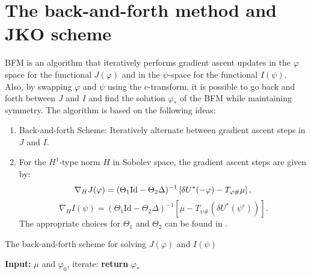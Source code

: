 \documentclass[a4,10.5pt, twocolumn, dvipdfmx]{article}
\theoremstyle{definition}
\begin{document}
\section{The back-and-forth method and JKO scheme }
BFM is an algorithm that iteratively performs gradient ascent updates in the \(\varphi\) space for the functional \(J(\varphi) \) and in the \(\psi\)-space for the functional \(I(\psi)\). 
Also, by swapping $\varphi$ and $\psi$ using the $c$-transform, it is possible to go back and forth between $J$ and $I$ and find the solution $\varphi_*$ of the BFM while maintaining symmetry.
The algorithm is based on the following ideas:
\begin{enumerate}
    \item Back-and-forth Scheme: Iteratively alternate between gradient ascent steps in $J$ and $I$.
    \item For the \(H^1\)-type norm \(H\) in Sobolev space, the gradient ascent steps are given by:
        \begin{equation*}
            \nabla_H J(\varphi) = (\Theta_1 \text{Id} - \Theta_2 \Delta)^{-1} \left[\delta U^*(- \varphi)-  T_{\varphi \#} \mu \right], \\
        \end{equation*}
        \begin{equation*}
            \nabla_H I(\psi) = (\Theta_1 \text{Id} - \Theta_2 \Delta)^{-1} \left[\mu - T_{\psi \#} (\delta U^*(\psi^c))\right].
        \end{equation*}
        The appropriate choices for \(\Theta_1\) and \(\Theta_2\) can be found in \cite{MR4238775}.
\end{enumerate}

\begin{algorithm}[tb]
    \caption{The back-and-forth scheme for solving $J(\varphi)$ and $I(\psi)$}
    \label{al:baf-method}
    \begin{algorithmic}
    \State \textbf{Input:} $\mu$ and $\varphi_0$, iterate:
    \State \textbf{return} $\varphi_*$
    \end{algorithmic}
\end{algorithm}
\end{document}
